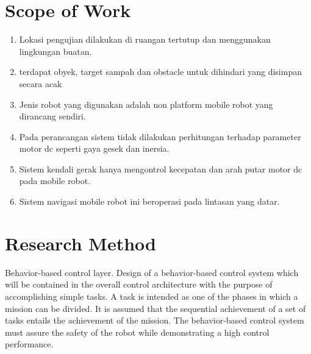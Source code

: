 \section{Scope of Work}

\begin{enumerate}
	\item Lokasi pengujian dilakukan di ruangan tertutup dan menggunakan lingkungan buatan.
	\item terdapat obyek, target sampah dan obstacle untuk dihindari yang disimpan secara acak
	\item Jenis robot yang digunakan adalah non platform mobile robot yang dirancang sendiri.
	\item Pada perancangan sistem tidak dilakukan perhitungan terhadap parameter motor dc seperti gaya gesek dan inersia.
	\item Sistem kendali gerak hanya mengontrol kecepatan dan arah putar motor dc pada mobile robot.
	\item Sistem navigasi mobile robot ini beroperasi pada lintasan yang datar.
\end{enumerate}


\section{Research Method}



Behavior-based control layer. Design of a behavior-based control system which will be contained in the overall control architecture with the purpose of accomplishing simple tasks. A task is intended as one of the phases in which a mission can be divided. It is assumed that the sequential achievement of a set of tasks entails the achievement of the mission. The behavior-based control system must assure the safety of the robot while demonstrating a high control performance.

